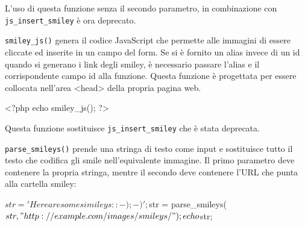
L'uso di questa funzione senza il secondo parametro, in combinazione con \verb|js_insert_smiley| è ora deprecato.

\verb|smiley_js()| genera il codice JavaScript che permette alle immagini di essere cliccate ed inserite in un campo del form. Se si è fornito un alias invece di un id quando si generano i link degli smiley, è necessario passare l'alias e il corrispondente campo id alla funzione. Questa funzione è progettata per essere collocata nell'area <head> della propria pagina web.

\begin{code}
<?php echo smiley_js(); ?>
\end{code}

Questa funzione sostituisce \verb|js_insert_smiley| che è stata deprecata.

\verb|parse_smileys()| prende una stringa di testo come input e sostituisce tutto il testo che codifica gli smile nell'equivalente immagine. Il primo parametro deve contenere la propria stringa, mentre il secondo deve contenere l'URL che punta alla cartella smiley:

\begin{code}
$str = 'Here are some simileys: :-) ;-)'; $str = parse_smileys($str, "http://example.com/images/smileys/"); echo $str;
\end{code}